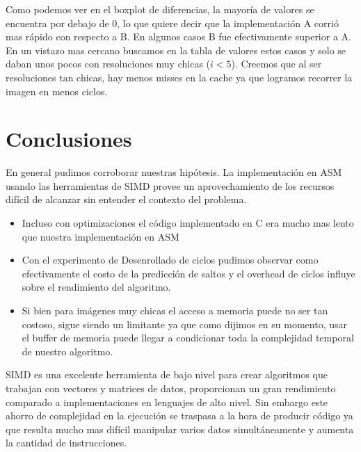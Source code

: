 \documentclass[a4paper]{article}
\begin{document}
Como podemos ver en el boxplot de diferencias, la mayoría de valores se encuentra por debajo de 0, lo que quiere decir que la implementaci\'on A corrió mas rápido con respecto a B. En algunos casos B fue efectivamente superior a A. En un vistazo mas cercano buscamos en la tabla de valores estos casos y solo se daban unos pocos con resoluciones muy chicas ($i < 5$). Creemos que al ser resoluciones tan chicas, hay menos misses en la cache ya que logramos recorrer la imagen en menos ciclos.

\section{Conclusiones}
En general pudimos corroborar nuestras hip\'otesis. La implementaci\'on en ASM usando las herramientas de SIMD provee un aprovechamiento de los recursos difícil de alcanzar sin entender el contexto del problema.


\begin{itemize}
	\item Incluso con optimizaciones el código implementado en C era mucho mas lento que nuestra implementación en ASM 
	\item Con el experimento de Desenrollado de ciclos pudimos observar como efectivamente el costo de la predicci\'on de saltos y el overhead de ciclos influye sobre el rendimiento del algoritmo.
	\item Si bien para imágenes muy chicas el acceso a memoria puede no ser tan costoso, sigue siendo un limitante ya que como dijimos en su momento, usar el buffer de memoria puede llegar a condicionar toda la complejidad temporal de nuestro algoritmo.
\end{itemize}

SIMD es una excelente herramienta de bajo nivel para crear algoritmos que trabajan con vectores y matrices de datos, proporcionan un gran rendimiento comparado a implementaciones en lenguajes de alto nivel. Sin embargo este ahorro de complejidad en la ejecución se traspasa a la hora de producir código ya que resulta mucho mas difícil manipular varios datos simultáneamente y aumenta la cantidad de instrucciones.
\end{document}

